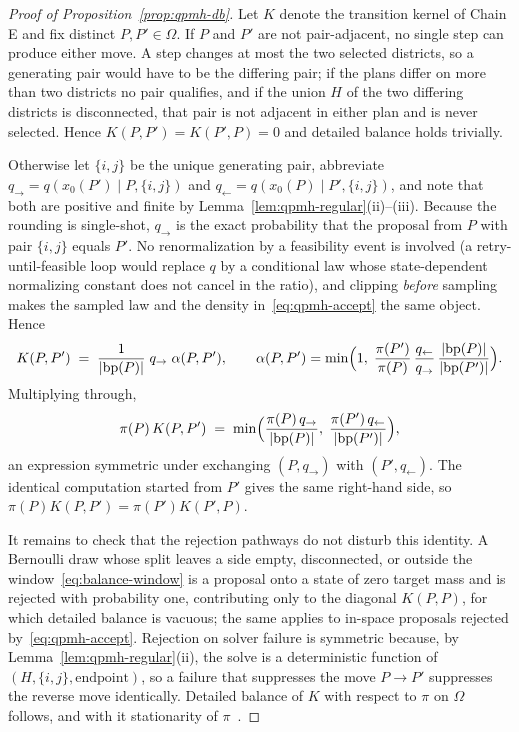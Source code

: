\documentclass[11pt]{article}
\begin{document}
\begin{proof}[Proof of Proposition~\ref{prop:qpmh-db}]
Let $K$ denote the transition kernel of Chain E and fix distinct
$P, P' \in \Omega$. If $P$ and $P'$ are not pair-adjacent, no single
step can produce either move. A step changes at most the two selected
districts, so a generating pair would have to be the differing pair;
if the plans differ on more than two districts no pair qualifies, and
if the union $H$ of the two differing districts is disconnected, that
pair is not adjacent in either plan and is never selected. Hence
$K(P, P') = K(P', P) = 0$ and detailed balance holds trivially.

Otherwise let $\{i,j\}$ be the unique generating pair, abbreviate
$q_{\to} = q(x_0(P') \mid P, \{i,j\})$ and
$q_{\gets} = q(x_0(P) \mid P', \{i,j\})$, and note that both are
positive and finite by Lemma~\ref{lem:qpmh-regular}(ii)--(iii).
Because the rounding is single-shot, $q_{\to}$ is the exact
probability that the proposal from $P$ with pair $\{i,j\}$ equals
$P'$. No renormalization by a feasibility event is involved (a
retry-until-feasible loop would replace $q$ by a conditional law
whose state-dependent normalizing constant does not cancel in the
ratio), and clipping \emph{before} sampling makes the sampled law and
the density in~\eqref{eq:qpmh-accept} the same object. Hence
\[
  K(P, P') \;=\; \frac{1}{|\mathrm{bp}(P)|}\; q_{\to}\;
  \alpha(P, P'), \qquad
  \alpha(P, P') = \min\Bigl(1,\;
  \frac{\pi(P')}{\pi(P)}\,
  \frac{q_{\gets}}{q_{\to}}\,
  \frac{|\mathrm{bp}(P)|}{|\mathrm{bp}(P')|}\Bigr).
\]
Multiplying through,
\[
  \pi(P)\, K(P, P') \;=\;
  \min\Bigl(
  \frac{\pi(P)\, q_{\to}}{|\mathrm{bp}(P)|},\;
  \frac{\pi(P')\, q_{\gets}}{|\mathrm{bp}(P')|}
  \Bigr),
\]
an expression symmetric under exchanging $(P, q_{\to})$ with
$(P', q_{\gets})$. The identical computation started from $P'$ gives
the same right-hand side, so
$\pi(P) K(P, P') = \pi(P') K(P', P)$.

It remains to check that the rejection pathways do not disturb this
identity. A Bernoulli draw whose split leaves a side empty,
disconnected, or outside the window~\eqref{eq:balance-window} is a
proposal onto a state of zero target mass and is rejected with
probability one, contributing only to the diagonal $K(P, P)$, for
which detailed balance is vacuous; the same applies to in-space
proposals rejected by~\eqref{eq:qpmh-accept}. Rejection on solver
failure is symmetric because, by
Lemma~\ref{lem:qpmh-regular}(ii), the solve is a deterministic
function of $(H, \{i,j\}, \text{endpoint})$, so a failure that
suppresses the move $P \to P'$ suppresses the reverse move
identically. Detailed balance of $K$ with respect to $\pi$ on
$\Omega$ follows, and with it stationarity of
$\pi$~\cite{tierney1998note}.
\end{proof}
\end{document}
